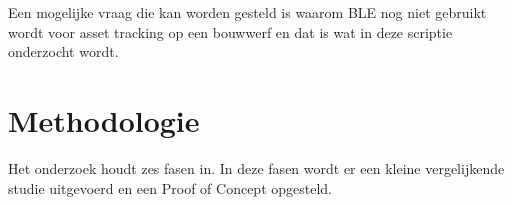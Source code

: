 Een mogelijke vraag die kan worden gesteld is waarom BLE nog niet gebruikt wordt voor asset tracking op een bouwwerf en dat is wat in deze scriptie onderzocht wordt.

%
%
%
%



\section{Methodologie}%
\label{sec:methodologie}

Het onderzoek houdt zes fasen in. In deze fasen wordt er een kleine vergelijkende studie uitgevoerd en een Proof of Concept opgesteld.

